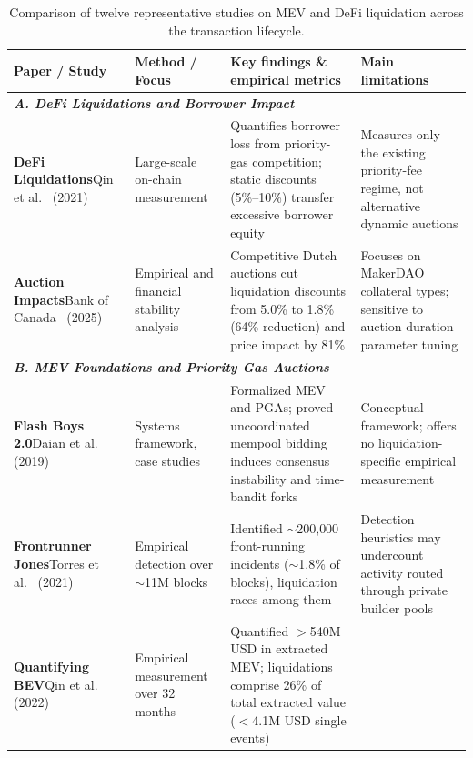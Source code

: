 \documentclass[conference]{IEEEtran}
\begin{document}
\begin{table}[!t]
\caption{Comparison of twelve representative studies on MEV and DeFi liquidation across the transaction lifecycle.}
\label{tab:litreview}
\centering
\renewcommand{\arraystretch}{1.25}
\footnotesize
\setlength{\tabcolsep}{3.5pt}
\begin{tabular}{p{3.0cm}p{3.1cm}p{6.4cm}p{4.5cm}}
\toprule
\textbf{Paper / Study} & \textbf{Method / Focus} & \textbf{Key findings \& empirical metrics} & \textbf{Main limitations} \\
\midrule
\multicolumn{4}{l}{\textit{\textbf{A. DeFi Liquidations and Borrower Impact}}} \\
\midrule
\textbf{DeFi Liquidations}\newline Qin et al.~\cite{qin2021empirical} (2021) &
Large-scale on-chain measurement &
Quantifies borrower loss from priority-gas competition; static discounts (5\%--10\%) transfer excessive borrower equity &
Measures only the existing priority-fee regime, not alternative dynamic auctions \\
\textbf{Auction Impacts}\newline Bank of Canada~\cite{bankofcanada2025} (2025) &
Empirical and financial stability analysis &
Competitive Dutch auctions cut liquidation discounts from 5.0\% to 1.8\% (64\% reduction) and price impact by 81\% &
Focuses on MakerDAO collateral types; sensitive to auction duration parameter tuning \\
\midrule
\multicolumn{4}{l}{\textit{\textbf{B. MEV Foundations and Priority Gas Auctions}}} \\
\midrule
\textbf{Flash Boys 2.0}\newline Daian et al.~\cite{daian2019flash} (2019) &
Systems framework, case studies &
Formalized MEV and PGAs; proved uncoordinated mempool bidding induces consensus instability and time-bandit forks &
Conceptual framework; offers no liquidation-specific empirical measurement \\
\textbf{Frontrunner Jones}\newline Torres et al.~\cite{torres2021frontrunner} (2021) &
Empirical detection over $\sim$11M blocks &
Identified $\sim$200{,}000 front-running incidents ($\sim$1.8\% of blocks), liquidation races among them &
Detection heuristics may undercount activity routed through private builder pools \\
\textbf{Quantifying BEV}\newline Qin et al.~\cite{qin2022quantifying} (2022) &
Empirical measurement over 32 months &
Quantified $>$540M USD in extracted MEV; liquidations comprise 26\% of total extracted value ($<$4.1M USD single events) &

\end{tabular}
\end{table}
\end{document}
